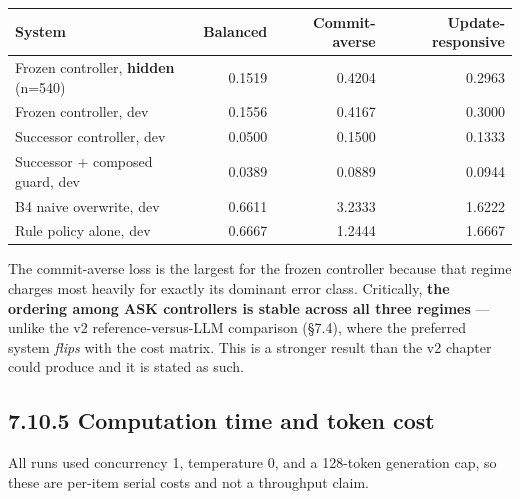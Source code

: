 {\def\LTcaptype{none} %
\begin{longtable}[]{@{}lrrr@{}}
\toprule\noalign{}
System & Balanced & Commit-averse & Update-responsive \\
\midrule\noalign{}
\endhead
\bottomrule\noalign{}
\endlastfoot
Frozen controller, \textbf{hidden} (n=540) & 0.1519 & 0.4204 & 0.2963 \\
Frozen controller, dev & 0.1556 & 0.4167 & 0.3000 \\
Successor controller, dev & 0.0500 & 0.1500 & 0.1333 \\
Successor + composed guard, dev & 0.0389 & 0.0889 & 0.0944 \\
B4 naive overwrite, dev & 0.6611 & 3.2333 & 1.6222 \\
Rule policy alone, dev & 0.6667 & 1.2444 & 1.6667 \\
\end{longtable}
}

The commit-averse loss is the largest for the frozen controller because
that regime charges most heavily for exactly its dominant error class.
Critically, \textbf{the ordering among ASK controllers is stable across
all three regimes} --- unlike the v2 reference-versus-LLM comparison
(§7.4), where the preferred system \emph{flips} with the cost matrix.
This is a stronger result than the v2 chapter could produce and it is
stated as such.

\subsection{7.10.5 Computation time and token
cost}\label{computation-time-and-token-cost}

All runs used concurrency 1, temperature 0, and a 128-token generation
cap, so these are per-item serial costs and not a throughput claim.

